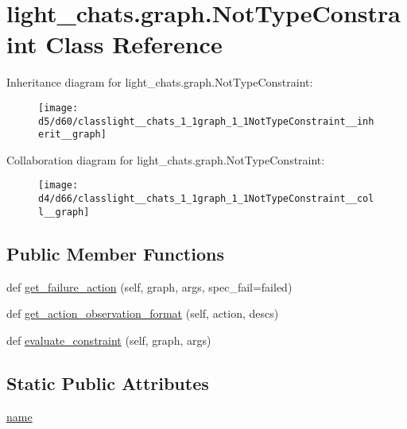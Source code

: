 \hypertarget{classlight__chats_1_1graph_1_1NotTypeConstraint}{}\section{light\+\_\+chats.\+graph.\+Not\+Type\+Constraint Class Reference}
\label{classlight__chats_1_1graph_1_1NotTypeConstraint}


Inheritance diagram for light\+\_\+chats.\+graph.\+Not\+Type\+Constraint\+:\nopagebreak
\begin{figure}[H]
\begin{center}
\leavevmode
\texttt{[image: d5/d60/classlight\_\_chats\_1\_1graph\_1\_1NotTypeConstraint\_\_inherit\_\_graph]}
\end{center}
\end{figure}


Collaboration diagram for light\+\_\+chats.\+graph.\+Not\+Type\+Constraint\+:\nopagebreak
\begin{figure}[H]
\begin{center}
\leavevmode
\texttt{[image: d4/d66/classlight\_\_chats\_1\_1graph\_1\_1NotTypeConstraint\_\_coll\_\_graph]}
\end{center}
\end{figure}
\subsection*{Public Member Functions}
\begin{DoxyCompactItemize}
\item 
def \hyperlink{classlight__chats_1_1graph_1_1NotTypeConstraint_a006f37da6afe1dd06db790a6d19b07db}{get\+\_\+failure\+\_\+action} (self, graph, args, spec\+\_\+fail=\textquotesingle{}failed\textquotesingle{})
\item 
def \hyperlink{classlight__chats_1_1graph_1_1NotTypeConstraint_a5676df24e75c1823bd7b555a266de5f3}{get\+\_\+action\+\_\+observation\+\_\+format} (self, action, descs)
\item 
def \hyperlink{classlight__chats_1_1graph_1_1NotTypeConstraint_a14b047c243e378910ac24f6a2e7571e9}{evaluate\+\_\+constraint} (self, graph, args)
\end{DoxyCompactItemize}
\subsection*{Static Public Attributes}
\begin{DoxyCompactItemize}
\item 
\hyperlink{classlight__chats_1_1graph_1_1NotTypeConstraint_ad6119b9dbdfc0d1049e91e3f46832601}{name}
\end{DoxyCompactItemize}


